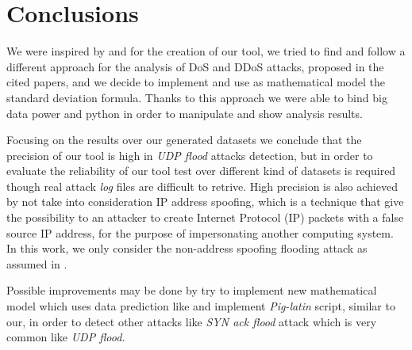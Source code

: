 \section{Conclusions}
\label{sec:colc}
We were inspired by \cite{detection_by_path_analaysis} and \cite{ddos_forensics} for the creation of our tool, we tried to find and follow a different approach for the analysis of DoS and DDoS attacks, proposed in the cited papers, and we decide to implement and use as mathematical model the standard deviation formula. Thanks to this approach we were able to bind big data power and python in order to manipulate and show analysis results.  

Focusing on the results over our generated datasets we conclude that the precision of our tool is high in \textit{UDP flood} attacks detection, but in order to evaluate the reliability of our tool test over different kind of datasets is required though real attack \textit{log} files are difficult to retrive. High precision is also achieved by not take into consideration IP address spoofing, which is a technique that give the possibility to an attacker to create Internet Protocol (IP) packets with a false source IP address, for the purpose of impersonating another computing system. In this work, we only consider the non-address spoofing flooding attack as assumed in \cite{ddos_forensics}. 

Possible improvements may be done by try to implement new mathematical model which uses data prediction like \cite{detection_by_path_analaysis} and implement \textit{Pig-latin} script, similar to our, in order to detect other attacks like \textit{SYN ack flood} attack which is very common like \textit{UDP flood}. 